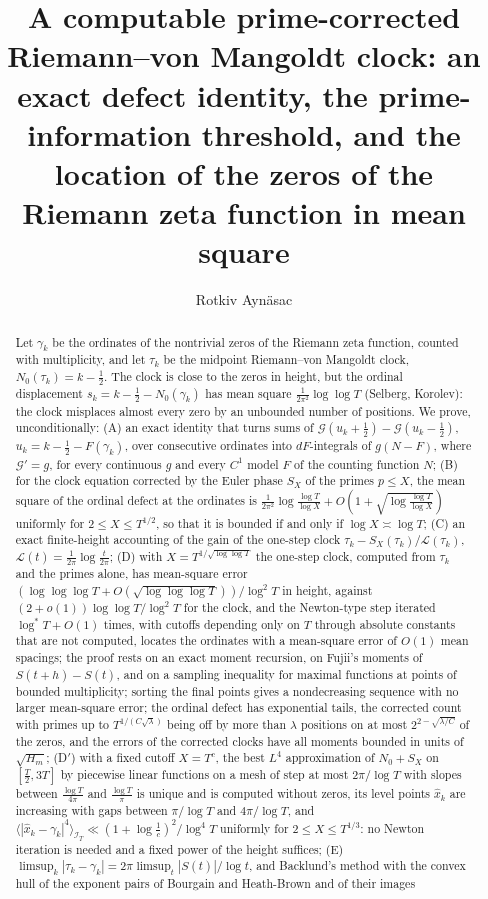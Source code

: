 \documentclass[preprint,12pt]{elsarticle}
\numberwithin{equation}{section}
\theoremstyle{plain}
\theoremstyle{definition}
\theoremstyle{remark}
\newcommand{\NO}{N_0}
\newcommand{\lL}{\mathcal L}
\newcommand{\IT}{\mathcal I_T}
\begin{document}
\begin{frontmatter}
\title{A computable prime-corrected Riemann--von Mangoldt clock: an exact defect identity, the prime-information threshold, and the location of the zeros of the Riemann zeta function in mean square}
\author{Rotkiv Ayn\"asac}

\begin{abstract}
Let $\gamma_k$ be the ordinates of the nontrivial zeros of the Riemann zeta function, counted with multiplicity, and let $\tau_k$ be the midpoint Riemann--von Mangoldt clock, $\NO(\tau_k)=k-\frac12$. The clock is close to the zeros in height, but the ordinal displacement $s_k=k-\frac12-\NO(\gamma_k)$ has mean square $\frac1{2\pi^2}\log\log T$ (Selberg, Korolev): the clock misplaces almost every zero by an unbounded number of positions. We prove, unconditionally: (A) an exact identity that turns sums of $\mathcal G(u_k+\frac12)-\mathcal G(u_k-\frac12)$, $u_k=k-\frac12-F(\gamma_k)$, over consecutive ordinates into $dF$-integrals of $g(N-F)$, where $\mathcal G'=g$, for every continuous $g$ and every $C^1$ model $F$ of the counting function $N$; (B) for the clock equation corrected by the Euler phase $S_X$ of the primes $p\le X$, the mean square of the ordinal defect at the ordinates is $\frac1{2\pi^2}\log\frac{\log T}{\log X}+O(1+\sqrt{\log\frac{\log T}{\log X}})$ uniformly for $2\le X\le T^{1/2}$, so that it is bounded if and only if $\log X\asymp\log T$; (C) an exact finite-height accounting of the gain of the one-step clock $\tau_k-S_X(\tau_k)/\lL(\tau_k)$, $\lL(t)=\frac1{2\pi}\log\frac t{2\pi}$; (D) with $X=T^{1/\sqrt{\log\log T}}$ the one-step clock, computed from $\tau_k$ and the primes alone, has mean-square error $(\log\log\log T+O(\sqrt{\log\log\log T}))/\log^2T$ in height, against $(2+o(1))\log\log T/\log^2T$ for the clock, and the Newton-type step iterated $\log^*T+O(1)$ times, with cutoffs depending only on $T$ through absolute constants that are not computed, locates the ordinates with a mean-square error of $O(1)$ mean spacings; the proof rests on an exact moment recursion, on Fujii's moments of $S(t+h)-S(t)$, and on a sampling inequality for maximal functions at points of bounded multiplicity; sorting the final points gives a nondecreasing sequence with no larger mean-square error; the ordinal defect has exponential tails, the corrected count with primes up to $T^{1/(C\sqrt\lambda)}$ being off by more than $\lambda$ positions on at most $2^{2-\sqrt{\lambda/C}}$ of the zeros, and the errors of the corrected clocks have all moments bounded in units of $\sqrt{H_m}$; (D$'$) with a fixed cutoff $X=T^c$, the best $L^4$ approximation of $\NO+S_X$ on $[\frac T2,3T]$ by piecewise linear functions on a mesh of step at most $2\pi/\log T$ with slopes between $\frac{\log T}{4\pi}$ and $\frac{\log T}\pi$ is unique and is computed without zeros, its level points $\widehat x_k$ are increasing with gaps between $\pi/\log T$ and $4\pi/\log T$, and $\langle|\widehat x_k-\gamma_k|^4\rangle_{\IT}\ll(1+\log\frac1c)^2/\log^4T$ uniformly for $2\le X\le T^{1/3}$: no Newton iteration is needed and a fixed power of the height suffices; (E) $\limsup_k|\tau_k-\gamma_k|=2\pi\limsup_t|S(t)|/\log t$, and Backlund's method with the convex hull of the exponent pairs of Bourgain and Heath-Brown and of their images 
\end{abstract}
\end{frontmatter}
\end{document}

